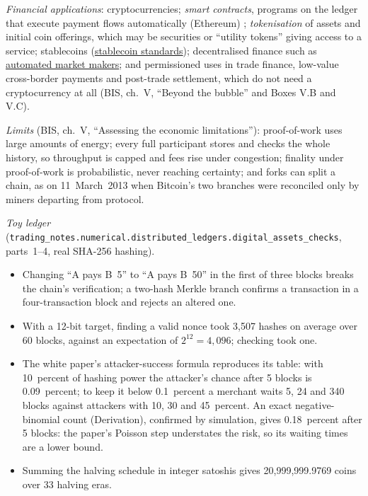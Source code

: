 \begin{qfdefinition}
\emph{Financial applications}: cryptocurrencies; \emph{smart contracts}, programs on the ledger that execute payment flows automatically (Ethereum) \citep[pp.~285--287]{crypto-narayanan}; \emph{tokenisation} of assets and initial coin offerings, which may be securities or ``utility tokens'' giving access to a service; stablecoins (\hyperref[rule:stablecoin-standards]{stablecoin standards}); decentralised finance such as \hyperref[def:amm-pool-mechanics]{automated market makers}; and permissioned uses in trade finance, low-value cross-border payments and post-trade settlement, which do not need a cryptocurrency at all (BIS, ch.~V, ``Beyond the bubble'' and Boxes V.B and V.C).

\emph{Limits} (BIS, ch.~V, ``Assessing the economic limitations''): proof-of-work uses large amounts of energy; every full participant stores and checks the whole history, so throughput is capped and fees rise under congestion; finality under proof-of-work is probabilistic, never reaching certainty; and forks can split a chain, as on 11~March~2013 when Bitcoin's two branches were reconciled only by miners departing from protocol.

 \emph{Toy ledger} (\nolinkurl{trading_notes.numerical.distributed_ledgers.digital_assets_checks}, parts~1--4, real SHA-256 hashing).
\begin{itemize}
\item Changing ``A pays B~5'' to ``A pays B~50'' in the first of three blocks breaks the chain's verification; a two-hash Merkle branch confirms a transaction in a four-transaction block and rejects an altered one.
\item With a 12-bit target, finding a valid nonce took 3{,}507 hashes on average over 60 blocks, against an expectation of $2^{12}=4{,}096$; checking took one.
\item The white paper's attacker-success formula reproduces its table: with 10~percent of hashing power the attacker's chance after 5 blocks is 0.09~percent; to keep it below 0.1~percent a merchant waits 5, 24 and 340 blocks against attackers with 10, 30 and 45~percent. An exact negative-binomial count (Derivation), confirmed by simulation, gives 0.18~percent after 5 blocks: the paper's Poisson step understates the risk, so its waiting times are a lower bound.
\item Summing the halving schedule in integer satoshis gives 20{,}999{,}999.9769 coins over 33 halving eras.
\end{itemize}


\end{qfdefinition}
